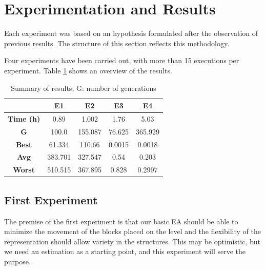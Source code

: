 \documentclass[runningheads,a4paper]{llncs}
\newcommand{\myfloatalign}{\centering} %
\begin{document}



\section{Experimentation and Results}\label{ch:res}
Each experiment was based on an hypothesis formulated after the observation of 
previous results. The structure of this section reflects this methodology.

Four experiments have been carried out, with more than 15 executions per 
experiment. Table \ref{t:resOver} shows an overview of the results.
\begin{table}[H]
	\myfloatalign
	\begin{tabular}{ccccc}
		& \textbf{E1} & \textbf{E2} & \textbf{E3} &\textbf{E4} \\ \hline
		\textbf{Time (h)} & 0.89 & 1.002 & 1.76 & 5.03 \\  \hline
		\textbf{G} &  100.0 & 155.087 & 76.625 & 365.929 \\  \hline
		\textbf{Best} & 61.334 & 110.66 & 0.0015 & 0.0018 \\  \hline
		\textbf{Avg} & 383.701 & 327.547 & 0.54 &  0.203 \\  \hline
		\textbf{Worst}  & 510.515 & 367.895 & 0.828 & 0.2997\\  \hline
		
		\hline
	\end{tabular}
	\caption{Summary of results, G: number of generations}
	\label{t:resOver}
\end{table}

\subsection{First Experiment}
The premise of the first experiment is that our basic EA should be able to 
minimize the movement of the blocks placed on the level and the flexibility of 
the representation should allow variety in the structures. This may be 
optimistic, but we need an estimation as a starting point, and this experiment 
will serve the purpose. 
\end{document}
